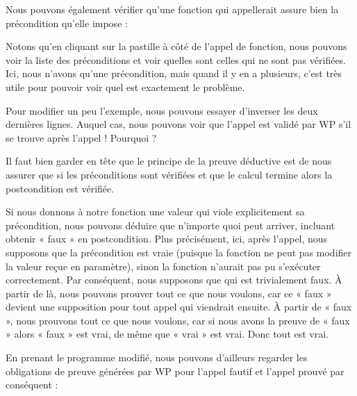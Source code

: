 

Nous pouvons également vérifier qu'une fonction qui appellerait 
assure bien la précondition qu'elle impose :







Notons qu'en cliquant sur la pastille à côté de l'appel de fonction, nous
pouvons voir la liste des préconditions et voir quelles sont celles qui ne sont
pas vérifiées. Ici, nous n'avons qu'une précondition, mais quand il y en a
plusieurs, c'est très utile pour pouvoir voir quel est exactement le problème.




Pour modifier un peu l'exemple, nous pouvons essayer d'inverser les deux
dernières lignes. Auquel cas, nous pouvons voir que l'appel 
est validé par WP s'il se trouve après l'appel  !
Pourquoi ?



Il faut bien garder en tête que le principe de la preuve déductive est de nous
assurer que si les préconditions sont vérifiées et que le calcul termine alors
la postcondition est vérifiée.


Si nous donnons à notre fonction une valeur qui viole explicitement sa
précondition, nous pouvons déduire que n'importe quoi peut arriver, incluant
obtenir « faux » en postcondition. Plus précisément, ici, après l'appel, nous
supposons que la précondition est vraie (puisque la fonction ne peut pas
modifier la valeur reçue en paramètre), sinon la fonction n'aurait pas pu
s'exécuter correctement. Par conséquent, nous supposons que
 qui est trivialement faux. À partir de là,
nous pouvons  prouver tout ce que nous voulons, car ce « faux » devient une
supposition pour tout appel qui viendrait ensuite. À partir de « faux », nous
prouvons tout ce que
nous voulons, car si nous avons la preuve de « faux » alors « faux » est vrai,
de même que « vrai » est vrai. Donc tout est vrai.



En prenant le programme modifié, nous pouvons d'ailleurs regarder les obligations
de preuve générées par WP pour l'appel fautif et l'appel prouvé par conséquent :





